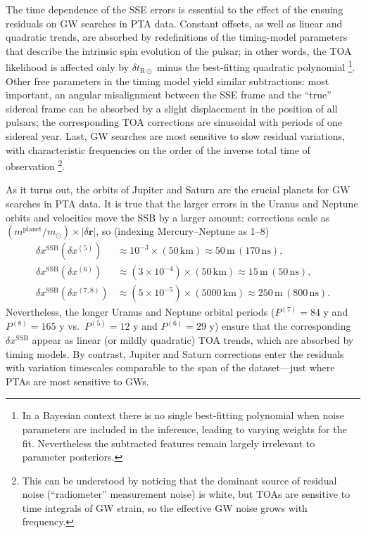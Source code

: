 \documentclass[iop,apj,twocolappendix]{emulateapj}
\begin{document}
The time dependence of the SSE errors is essential to the effect of the ensuing residuals on GW searches in PTA data. Constant offsets, as well as linear and quadratic trends, are absorbed by redefinitions of the timing-model parameters that describe the intrinsic spin evolution of the pulsar; in other words, the TOA likelihood is affected only by $\delta t_{\mathrm{R}\odot}$ minus the best-fitting quadratic polynomial \footnote{In a Bayesian context there is no single best-fitting polynomial when noise parameters are included in the inference, leading to varying weights for the fit. Nevertheless the subtracted features remain largely irrelevant to parameter posteriors.}. Other free parameters in the timing model yield similar subtractions: most important, an angular misalignment between the SSE frame and the ``true'' sidereal frame can be absorbed by a slight displacement in the position of all pulsars; the corresponding TOA corrections are sinusoidal with periods of one sidereal year.
Last, GW searches are most sensitive to slow residual variations, with characteristic frequencies on the order of the inverse total time of observation \footnote{This can be understood by noticing that the dominant source of residual noise (``radiometer'' measurement noise) is white, but TOAs are sensitive to time integrals of GW strain, so the effective GW noise grows with frequency.}.

As it turns out, the orbits of Jupiter and Saturn are the crucial planets for GW searches in PTA data.  It is true that the larger errors in the Uranus and Neptune orbits and velocities move the SSB by a larger amount: corrections scale as $(m^\mathrm{planet}/m_\mathrm{\odot}) \times |\delta \mathbf{r}|$, so (indexing Mercury--Neptune as 1--8)
%
\begin{equation}
    \begin{aligned}
    \delta x^\mathrm{SSB}(\delta x^{(5)}) & \approx 10^{-3} \!\times\! (50 \, \mathrm{km}) \approx 50 \, \mathrm{m} \, (170 \, \mathrm{ns}), \\
    \delta x^\mathrm{SSB}(\delta x^{(6)}) & \approx (3 \!\times\! 10^{-4}) \!\times\! (50 \, \mathrm{km}) \approx 15 \, \mathrm{m} \, (50 \, \mathrm{ns}), \\
    \delta x^\mathrm{SSB}(\delta x^{(7,8)}) & \approx (5 \!\times\! 10^{-5}) \!\times\! (5000 \, \mathrm{km}) \approx 250 \, \mathrm{m} \, (800 \, \mathrm{ns}).
    \end{aligned}
\end{equation}
%
Nevertheless, the longer Uranus and Neptune orbital periods ($P^{(7)} = 84$ y and $P^{(8)} = 165$ y vs.\ $P^{(5)} = 12$ y and $P^{(6)} = 29$ y) ensure that the corresponding $\delta x^\mathrm{SSB}$ appear as linear (or mildly quadratic) TOA trends, which are absorbed by timing models. By contrast, Jupiter and Saturn corrections enter the residuals with variation timescales comparable to the span of the dataset---just where PTAs are most sensitive to GWs.
\end{document}
